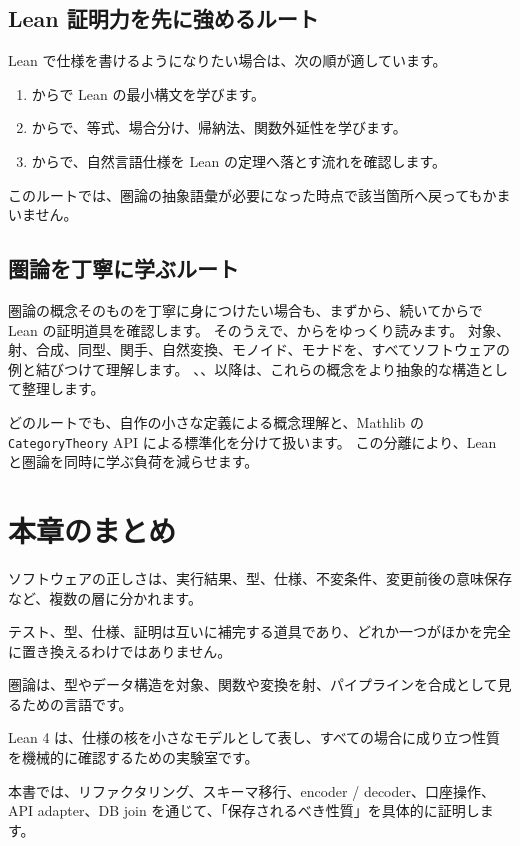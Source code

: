 \subsection{Lean 証明力を先に強めるルート}

Lean で仕様を書けるようになりたい場合は、次の順が適しています。

\begin{enumerate}
\item {}からで Lean の最小構文を学びます。
\item {}からで、等式、場合分け、帰納法、関数外延性を学びます。
\item {}からで、自然言語仕様を Lean の定理へ落とす流れを確認します。
\end{enumerate}

このルートでは、圏論の抽象語彙が必要になった時点で該当箇所へ戻ってもかまいません。

\subsection{圏論を丁寧に学ぶルート}

圏論の概念そのものを丁寧に身につけたい場合も、まずから、続いてからで Lean の証明道具を確認します。
そのうえで、からをゆっくり読みます。
対象、射、合成、同型、関手、自然変換、モノイド、モナドを、すべてソフトウェアの例と結びつけて理解します。
、、以降は、これらの概念をより抽象的な構造として整理します。

どのルートでも、自作の小さな定義による概念理解と、Mathlib の \texttt{CategoryTheory} API による標準化を分けて扱います。
この分離により、Lean と圏論を同時に学ぶ負荷を減らせます。

\section{本章のまとめ}

ソフトウェアの正しさは、実行結果、型、仕様、不変条件、変更前後の意味保存など、複数の層に分かれます。

テスト、型、仕様、証明は互いに補完する道具であり、どれか一つがほかを完全に置き換えるわけではありません。

圏論は、型やデータ構造を対象、関数や変換を射、パイプラインを合成として見るための言語です。

Lean 4 は、仕様の核を小さなモデルとして表し、すべての場合に成り立つ性質を機械的に確認するための実験室です。

本書では、リファクタリング、スキーマ移行、encoder / decoder、口座操作、API adapter、DB join を通じて、「保存されるべき性質」を具体的に証明します。
